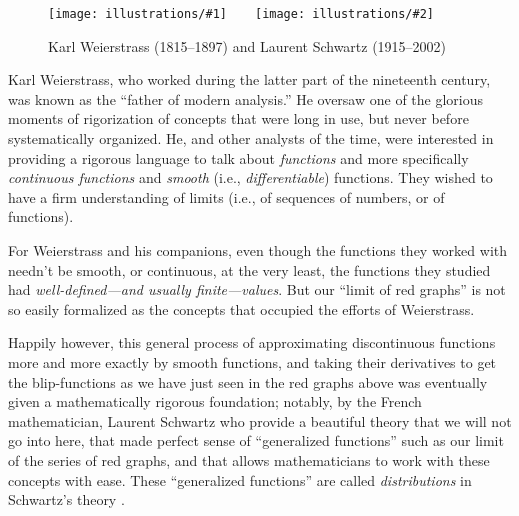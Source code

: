 \documentclass[openany]{book}
\newcommand{\illtwo}[4]{%
   \begin{figure}[H]\centering%
   \texttt{[image: illustrations/\#1]}$\qquad$\texttt{[image: illustrations/\#2]}%
   \caption{#4}%
    \end{figure}}
\theoremstyle{plain}
\theoremstyle{definition}
\begin{document}
{{ %

 \illtwo{weierstrass}{schwartz}{.3}{Karl Weierstrass (1815--1897) and Laurent Schwartz (1915--2002)}

 Karl Weierstrass, who worked during the latter part of the nineteenth
 century, was known as the ``father of modern analysis.'' He oversaw
 one of the glorious moments of rigorization of concepts that were
 long in use, but never before systematically organized.  He, and
 other analysts of the time, were interested in providing a rigorous
 language to talk about {\it functions} and more specifically {\it
   continuous functions} and {\it smooth} (i.e., {\it differentiable})
 functions. They wished to have a firm understanding of limits (i.e.,
 of sequences of numbers, or of functions).


 For Weierstrass and his companions, even though the functions they
 worked with needn't be smooth, or continuous, at the very least, the
 functions they studied had {\it well-defined---and usually
   finite---values}.  But our ``limit of red graphs'' is not so easily
 formalized as the concepts that occupied the efforts of
 Weierstrass.

 Happily however, this general process of approximating
 discontinuous functions more and more exactly by smooth functions,
 and taking their derivatives to get the blip-functions as we have
 just seen in the red graphs above was eventually given a
 mathematically rigorous foundation; notably, by the French
 mathematician, Laurent Schwartz who provide a beautiful theory that
 we will not go into here, that made perfect sense of ``generalized
 functions'' such as our limit of the series of red graphs, and that
 allows mathematicians to work with these concepts with ease. These
 ``generalized functions'' are called {\it distributions} in
 Schwartz's theory .




}}
\end{document}
